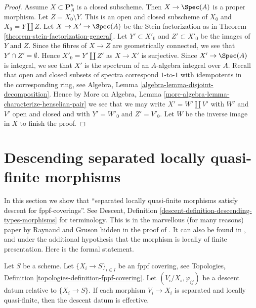\begin{proof}
\medskip\noindent
Assume $X \subset \mathbf{P}^n_A$ is a closed subscheme.
Then $X \to \Spec(A)$ is a proper morphism.
Let $Z = X_0 \setminus Y$. This is an open and closed
subscheme of $X_0$ and $X_0 = Y \amalg Z$.
Let $X \to X' \to \Spec(A)$ be the Stein factorization as in
Theorem \ref{theorem-stein-factorization-general}.
Let $Y' \subset X'_0$ and $Z' \subset X'_0$ be the images of
$Y$ and $Z$.
Since the fibres of $X \to Z$ are geometrically connected,
we see that $Y' \cap Z' = \emptyset$.
Hence $X'_0 = Y' \amalg Z'$ as $X \to X'$ is surjective.
Since $X' \to \Spec(A)$ is integral, we see that
$X'$ is the spectrum of an $A$-algebra integral over $A$.
Recall that open and closed subsets of spectra correspond
$1$-to-$1$ with idempotents in the corresponding ring, see
Algebra, Lemma \ref{algebra-lemma-disjoint-decomposition}.
Hence by
More on Algebra, Lemma \ref{more-algebra-lemma-characterize-henselian-pair}
we see that we may write $X' = W' \amalg V'$
with $W'$ and $V'$ open and closed and
with $Y' = W'_0$ and $Z' = V'_0$.
Let $W$ be the inverse image in $X$
to finish the proof.
\end{proof}













\section{Descending separated locally quasi-finite morphisms}
\label{section-separated-locally-quasi-finite}

\noindent
In this section we show that ``separated locally quasi-finite morphisms
satisfy descent for fppf-coverings''. See Descent, Definition
\ref{descent-definition-descending-types-morphisms} for terminology.
This is in the marvellous
(for many reasons) paper by Raynaud and Gruson hidden in the proof
of \cite[Lemma 5.7.1]{GruRay}.
It can also be found in \cite{Murre-representation}, and
\cite[Expos\'e X, Lemma 5.4]{SGA3}
under the additional
hypothesis that the morphism is locally of finite presentation.
Here is the formal statement.

\begin{lemma}
\label{lemma-separated-locally-quasi-finite-morphisms-fppf-descend}
Let $S$ be a scheme.
Let $\{X_i \to S\}_{i\in I}$ be an fppf covering, see
Topologies, Definition \ref{topologies-definition-fppf-covering}.
Let $(V_i/X_i, \varphi_{ij})$ be a descent datum
relative to $\{X_i \to S\}$. If each morphism
$V_i \to X_i$ is separated and locally quasi-finite,
then the descent datum is effective.
\end{lemma}

